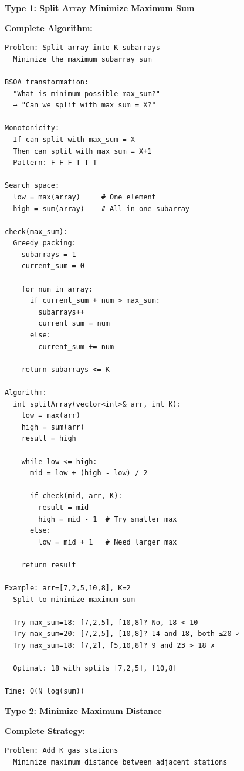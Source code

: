 \documentclass[11pt,a4paper,oneside]{book}
\begin{document}
\begin{tcolorbox}[
    enhanced,breakable,
    colback=successgreen!10,
    colframe=successgreen,
    boxrule=1.5pt,
    arc=3mm,
    title=\textbf{Complete Minimize Maximum Algorithms}
]
\textbf{Type 1: Split Array Minimize Maximum Sum}

\textbf{Complete Algorithm:}
\begin{verbatim}
Problem: Split array into K subarrays
  Minimize the maximum subarray sum

BSOA transformation:
  "What is minimum possible max_sum?"
  → "Can we split with max_sum = X?"

Monotonicity:
  If can split with max_sum = X
  Then can split with max_sum = X+1
  Pattern: F F F T T T

Search space:
  low = max(array)     # One element
  high = sum(array)    # All in one subarray

check(max_sum):
  Greedy packing:
    subarrays = 1
    current_sum = 0
    
    for num in array:
      if current_sum + num > max_sum:
        subarrays++
        current_sum = num
      else:
        current_sum += num
    
    return subarrays <= K

Algorithm:
  int splitArray(vector<int>& arr, int K):
    low = max(arr)
    high = sum(arr)
    result = high
    
    while low <= high:
      mid = low + (high - low) / 2
      
      if check(mid, arr, K):
        result = mid
        high = mid - 1  # Try smaller max
      else:
        low = mid + 1   # Need larger max
    
    return result

Example: arr=[7,2,5,10,8], K=2
  Split to minimize maximum sum
  
  Try max_sum=18: [7,2,5], [10,8]? No, 18 < 10
  Try max_sum=20: [7,2,5], [10,8]? 14 and 18, both ≤20 ✓
  Try max_sum=18: [7,2], [5,10,8]? 9 and 23 > 18 ✗
  
  Optimal: 18 with splits [7,2,5], [10,8]

Time: O(N log(sum))
\end{verbatim}

\textbf{Type 2: Minimize Maximum Distance}

\textbf{Complete Strategy:}
\begin{verbatim}
Problem: Add K gas stations
  Minimize maximum distance between adjacent stations


\end{verbatim}
\end{tcolorbox}
\end{document}

